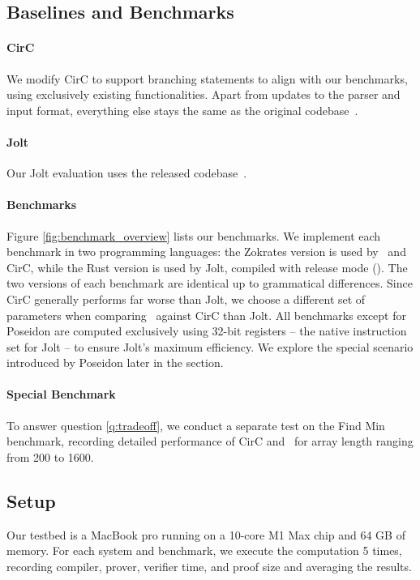 \subsection{Baselines and Benchmarks}
\paragraph{CirC} We modify CirC to support branching statements to align with our benchmarks, using exclusively existing functionalities. Apart from updates to the parser and input format, everything else stays the same as the original codebase~\cite{circ_codebase}.

\paragraph{Jolt} Our Jolt evaluation uses the released codebase~\cite{jolt_codebase}.

\paragraph{Benchmarks} Figure \ref{fig:benchmark_overview} lists our benchmarks. We implement each benchmark in two programming languages: the Zokrates version is used by \CoBBl~and CirC, while the Rust version is used by Jolt, compiled with release mode (). The two versions of each benchmark are identical up to grammatical differences. Since CirC generally performs far worse than Jolt, we choose a different set of parameters when comparing \CoBBl~against CirC than Jolt. All benchmarks except for Poseidon are computed exclusively using 32-bit registers -- the native instruction set for Jolt -- to ensure Jolt's maximum efficiency. We explore the special scenario introduced by Poseidon later in the section.

\paragraph{Special Benchmark} To answer question \ref{q:tradeoff}, we conduct a separate test on the Find Min benchmark, recording detailed performance of CirC and \CoBBl~for array length ranging from 200 to 1600.



\subsection{Setup}
Our testbed is a MacBook pro running on a 10-core M1 Max chip and 64 GB of memory. For each system and benchmark, we execute the computation 5 times, recording compiler, prover, verifier time, and proof size and averaging the results. 

